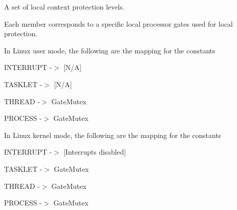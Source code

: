A set of local context protection levels. 

Each member corresponds to a specific local processor gates used for local protection.

In Linux user mode, the following are the mapping for the constants
\begin{DoxyItemize}
\item INTERRUPT -\/$>$ \mbox{[}N/A\mbox{]}
\item TASKLET -\/$>$ \mbox{[}N/A\mbox{]}
\item THREAD -\/$>$ GateMutex
\item PROCESS -\/$>$ GateMutex
\end{DoxyItemize}

In Linux kernel mode, the following are the mapping for the constants
\begin{DoxyItemize}
\item INTERRUPT -\/$>$ \mbox{[}Interrupts disabled\mbox{]}
\item TASKLET -\/$>$ GateMutex
\item THREAD -\/$>$ GateMutex
\item PROCESS -\/$>$ GateMutex
\end{DoxyItemize}

